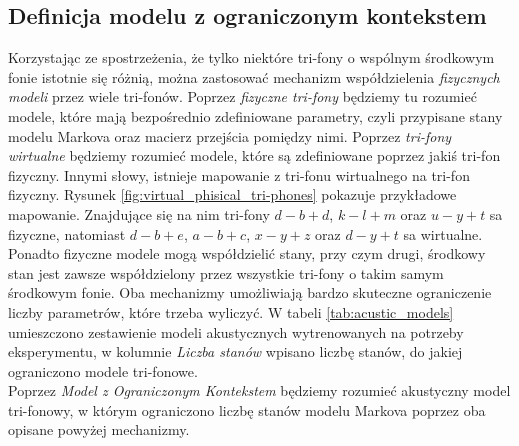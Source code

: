 \documentclass[11pt]{article}
\begin{document}
	\subsection{ Definicja modelu z ograniczonym kontekstem }
		\label{sec:tri-fone_mapping}
		Korzystając ze spostrzeżenia, że tylko niektóre tri-fony o wspólnym środkowym fonie istotnie się różnią, można zastosować mechanizm współdzielenia \textit{fizycznych modeli} przez wiele tri-fonów. Poprzez \textit{fizyczne tri-fony} będziemy tu rozumieć modele, które mają bezpośrednio zdefiniowane parametry, czyli przypisane stany modelu Markova oraz macierz przejścia pomiędzy nimi. Poprzez \textit{tri-fony wirtualne} będziemy rozumieć modele, które są zdefiniowane poprzez jakiś tri-fon fizyczny. Innymi słowy, istnieje mapowanie z tri-fonu wirtualnego na tri-fon fizyczny. Rysunek \ref{fig:virtual_phisical_tri-phones} pokazuje przykładowe mapowanie. Znajdujące się na nim tri-fony $d-b+d$, $k-l+m$ oraz $u-y+t$ sa fizyczne, natomiast $d-b+e$, $a-b+c$, $x-y+z$ oraz $d-y+t$ sa wirtualne. Ponadto fizyczne modele mogą współdzielić stany, przy czym drugi, środkowy stan jest zawsze współdzielony przez wszystkie tri-fony o takim samym środkowym fonie. Oba mechanizmy umożliwiają bardzo skuteczne ograniczenie liczby parametrów, które trzeba wyliczyć. W tabeli \ref{tab:acustic_models} umieszczono zestawienie modeli akustycznych wytrenowanych na potrzeby eksperymentu, w kolumnie \textit{Liczba stanów} wpisano liczbę stanów, do jakiej ograniczono modele tri-fonowe. \\
		Poprzez \textit{Model z Ograniczonym Kontekstem} będziemy rozumieć akustyczny model tri-fonowy, w którym ograniczono liczbę stanów modelu Markova poprzez oba opisane powyżej mechanizmy.
		
\end{document}
